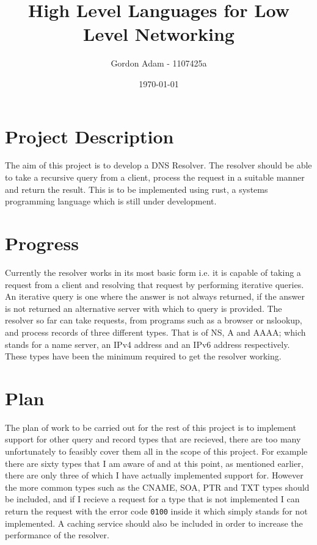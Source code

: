 \documentclass[a4paper]{article}
\title{High Level Languages for Low Level Networking}
\author{Gordon Adam - 1107425a}
\date{\today}
\begin{document}
\maketitle

\pagebreak

\section{Project Description}
The aim of this project is to develop a DNS Resolver. The resolver should be able to take a recursive query from a client, process the request in a suitable manner and return the result. This is to be implemented using rust, a systems programming language which is still under development.
\section{Progress}
Currently the resolver works in its most basic form i.e. it is capable of taking a request from a client and resolving that request by performing iterative queries. An iterative query is one where the answer is not always returned, if the answer is not returned an alternative server with which to query is provided. The resolver so far can take requests, from programs such as a browser or nslookup, and process records of three different types. That is of NS, A and AAAA; which stands for a name server, an IPv4 address and an IPv6 address respectively. These types have been the minimum required to get the resolver working.
\section{Plan}
The plan of work to be carried out for the rest of this project is to implement support for other query and record types that are recieved, there are too many unfortunately to feasibly cover them all in the scope of this project. For example there are sixty types that I am aware of and at this point, as mentioned earlier, there are only three of which I have actually implemented support for. However the more common types such as the CNAME, SOA, PTR and TXT types should be included, and if I recieve a request for a type that is not implemented I can return the request with the error code \verb+0100+ inside it which simply stands for not implemented. A caching service should also be included in order to increase the performance of the resolver.
\end{document}
